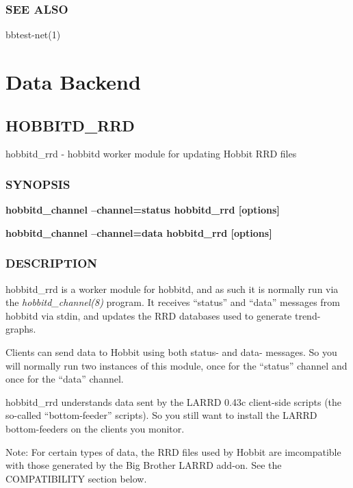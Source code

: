  
\subsection{SEE ALSO}
bbtest-net(1) 
  

%
\chapter{Data Backend}
\section{HOBBITD\_RRD}

 hobbitd\_rrd - hobbitd worker module for updating Hobbit RRD files

\subsection{SYNOPSIS}
\textbf{hobbitd\_channel --channel=status hobbitd\_rrd [options]}
 
\textbf{hobbitd\_channel --channel=data hobbitd\_rrd [options]}


 
\subsection{DESCRIPTION}
 hobbitd\_rrd is a worker module for hobbitd, and as such it is normally run via the \emph{hobbitd\_channel(8)}
 program. It receives ``status'' and ``data'' messages from hobbitd via stdin, and updates the RRD databases used to generate trend-graphs. 

  Clients can send data to Hobbit using both status- and data- messages. So you will normally run two instances of this module, once for the ``status'' channel and once for the ``data'' channel. 


  hobbitd\_rrd understands data sent by the LARRD 0.43c client-side scripts (the so-called ``bottom-feeder'' scripts). So you still want to install the LARRD bottom-feeders on the clients you monitor. 


  Note: For certain types of data, the RRD files used by Hobbit are imcompatible with those generated by the Big Brother LARRD add-on. See the COMPATIBILITY section below. 


 


